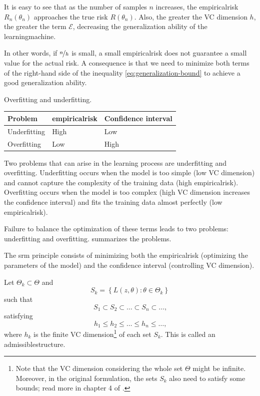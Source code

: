 It is easy to see that as the number of samples $n$ increases, the \gls{empiricalrisk}
$R_n(\theta_n)$ approaches the true risk $R(\theta_n)$.  Also, the greater the VC
dimension $h$, the greater the term $\mathcal{E}$, decreasing the generalization ability
of the \gls{learningmachine}.

In other words, if $\nicefrac{n}{h}$ is small, a small \gls{empiricalrisk} does not guarantee a small value
for the actual risk.  A consequence is that we need to minimize both terms of the
right-hand side of the inequality \cref{eq:generalization-bound} to achieve a good
generalization ability.

\begin{tablebox}[label=tab:overfit-underfit]{Overfitting and underfitting.}
  \centering
  \begin{tabular}{lll}
    \toprule
    \textbf{Problem} & \textbf{\Gls{empiricalrisk}} & \textbf{Confidence interval} \\
    \midrule
    Underfitting & High & Low \\
    Overfitting & Low & High \\
    \bottomrule
  \end{tabular}
  \tcblower
  Two problems that can arise in the learning process are underfitting and overfitting.
  Underfitting occurs when the model is too simple (low VC dimension) and cannot capture
  the complexity of the training data (high \gls{empiricalrisk}).  Overfitting occurs when the
  model is too complex (high VC dimension increases the confidence interval) and fits the
  training data almost perfectly (low \gls{empiricalrisk}).
\end{tablebox}

Failure to balance the optimization of these terms leads to two problems: underfitting and
overfitting.   summarizes the problems.

The \gls{srm} principle consists of minimizing both the \gls{empiricalrisk} (optimizing the
parameters of the model) and the confidence interval (controlling VC dimension).

Let $\Theta_k \subset \Theta$ and
\[
  S_k = \left\{ L(z, \theta) : \theta \in \Theta_k \right\}
\]
such that
\[
  S_1 \subset S_2 \subset \dots \subset S_n \subset \dots\text{,}
\]
satisfying
\[
  h_1 \leq h_2 \leq \dots \leq h_n \leq \dots\text{,}
\]
where $h_k$ is the finite VC dimension\footnote{Note that the VC dimension considering the
whole set $\Theta$ might be infinite.  Moreover, in the original formulation, the sets
$S_k$ also need to satisfy some bounds; read more in chapter 4 of .}
of each set $S_k$.  This is called an \gls{admissiblestructure}.

